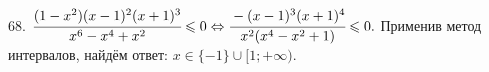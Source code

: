 68. $\cfrac{(1-x^2)(x-1)^2(x+1)^3}{x^6-x^4+x^2}\leqslant0\Leftrightarrow\cfrac{-(x-1)^3(x+1)^4}{x^2(x^4-x^2+1)}\leqslant0.$ Применив метод интервалов, найдём ответ: $x\in\{-1\}\cup[1;+\infty).$
\begin{figure}[ht!]
\end{figure}\\
